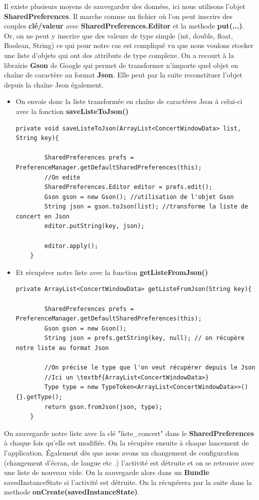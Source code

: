 \documentclass{article}
\begin{document}
Il existe plusieurs moyens de sauvegarder des données, ici nous utilisons l'objet \textbf{SharedPreferences}. Il marche comme un fichier où l'on peut inscrire des couples \textbf{clé/valeur} avec \textbf{SharedPreferences.Editor} et la methode \textbf{put(...)}. Or, on ne peut y inscrire que des valeurs de type simple (int, double, float, Boolean, String) ce qui pour notre cas est compliqué vu que nous voulons stocker une liste d'objets qui ont des attributs de type complexe. On a recourt à la librairie \textbf{Gson} de Google qui permet de transformer n'importe quel objet en chaîne de caractère au format \textbf{Json}. Elle peut par la suite reconstituer l'objet depuis la chaîne Json également.
\begin{itemize}
\item On envoie donc la liste transformée en chaîne de caractères Json à celui-ci avec la fonction \textbf{saveListeToJson()} 
\begin{verbatim}
private void saveListeToJson(ArrayList<ConcertWindowData> list, String key){

        SharedPreferences prefs = PreferenceManager.getDefaultSharedPreferences(this);
        //On edite 
        SharedPreferences.Editor editor = prefs.edit();
        Gson gson = new Gson(); //utilisation de l'objet Gson
        String json = gson.toJson(list); //transforme la liste de concert en Json
        editor.putString(key, json);

        editor.apply();
    }
\end{verbatim}
\item Et récupérer notre liste avec la fonction \textbf{getListeFromJson()}
\begin{verbatim}
private ArrayList<ConcertWindowData> getListeFromJson(String key){

        SharedPreferences prefs = PreferenceManager.getDefaultSharedPreferences(this);
        Gson gson = new Gson();
        String json = prefs.getString(key, null); // on récupère notre liste au format Json
        
        //On précise le type que l'on veut récupérer depuis le Json 
        //Ici un \textbf{ArrayList<ConcertWindowData>}
        Type type = new TypeToken<ArrayList<ConcertWindowData>>() {}.getType();
        return gson.fromJson(json, type);
    }
\end{verbatim}
\end{itemize}

On sauvegarde notre liste avec la clé "liste\_concert" dans le \textbf{SharedPreferences} à chaque fois qu'elle est modifiée. On la récupère ensuite à chaque lancement de l'application. 
\vspace{1\baselineskip}
Également dès que nous avons un changement de configuration (changement d'écran, de langue etc .) l'activité est détruite et on se retrouve avec une liste de nouveau vide. On la sauvegarde alors dans un \textbf{Bundle} savedInstanceState si l'activité est détruite. On la récupérera par la suite dans la methode \textbf{onCreate(savedInstanceState)}.
\end{document}
